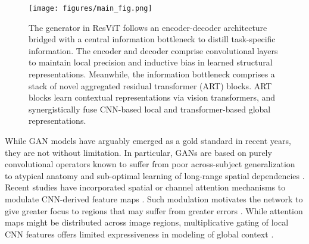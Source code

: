 \documentclass[journal,twoside,web]{ieeecolor}
\begin{document}
\begin{figure*}[!t]
\vspace{-2.5ex}
 \begin{minipage}[c]{0.7\textwidth}
\centerline{\texttt{[image: figures/main\_fig.png]}}
 \end{minipage}\hfill
 \begin{minipage}[c]{0.3\textwidth}
 \caption{The generator in ResViT follows an encoder-decoder architecture bridged with a central information bottleneck to distill task-specific information. The encoder and decoder comprise convolutional layers to maintain local precision and inductive bias in learned structural representations. Meanwhile, the information bottleneck comprises a stack of novel aggregated residual transformer (ART) blocks. ART blocks learn contextual representations via vision transformers, and synergistically fuse CNN-based local and transformer-based global representations. }
 \label{fig:main_fig}
 \end{minipage}
\vspace{-3.5ex}
\end{figure*}
\par
While GAN models have arguably emerged as a gold standard in recent years, they are not without limitation. In particular, GANs are based on purely convolutional operators known to suffer from poor across-subject generalization to atypical anatomy and sub-optimal learning of long-range spatial dependencies \cite{wang2018nonlocal,kodali2018}. Recent studies have incorporated spatial or channel attention mechanisms to modulate CNN-derived feature maps \cite{kearney2020,sagan,attention_unet,lan2020,zhao2020,yuan2020,li2020}. Such modulation motivates the network to give greater focus to regions that may suffer from greater errors \cite{sagan,attention_unet}. While attention maps might be distributed across image regions, multiplicative gating of local CNN features offers limited expressiveness in modeling of global context \cite{xie2021,trans_unet,dai2021}. 
\end{document}
